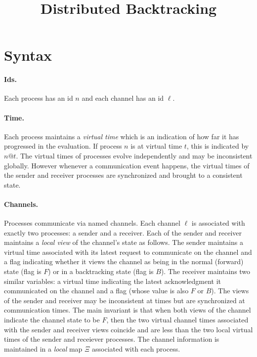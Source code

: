 \documentclass{article}
\title{Distributed Backtracking}
\author{}
\date{}
\begin{document}
\maketitle

\newcommand{\todo}[1]{\fbox{#1}}

\newcommand{\alt}{~|~}
\newcommand{\parc}[2]{#1 \,\|\, #2}
\newcommand{\send}[2]{\texttt{send}~#1~#2}
\newcommand{\stable}[1]{\texttt{stable}~#1}
\newcommand{\stableu}[1]{\underline{\texttt{stable}}~#1}
\newcommand{\backtrack}[1]{\texttt{backtrack}~#1}
\newcommand{\abacktrack}{\texttt{backtrack}\_}
\newcommand{\recv}[4]{\texttt{recv}~(#1.#2) \talloblong (#3.#4)}
\newcommand{\proc}[5]{\langle #1@#5:~ #3, #2,#4 \rangle}

\section{Syntax} 

\paragraph*{Ids.} Each process has an id $n$ and each channel has an id
$\ell$.

\paragraph*{Time.} Each process maintains a \emph{virtual time} which is an
indication of how far it has progressed in the evaluation. If process $n$ is
at virtual time $t$, this is indicated by $n@t$. The virtual times of
processes evolve independently and may be inconsistent globally. However
whenever a communication event happens, the virtual times of the sender and
receiver processes are synchronized and brought to a consistent state.

\paragraph*{Channels.} Processes communicate via named channels. Each channel
$\ell$ is associated with exactly two processes: a sender and a receiver.
Each of the sender and receiver maintains a \emph{local view} of the
channel's state as follows. The sender maintains a virtual time associated
with its latest request to communicate on the channel and a flag indicating
whether it views the channel as being in the normal (forward) state (flag is
$F$) or in a backtracking state (flag is $B$). The receiver maintains two
similar variables: a virtual time indicating the latest acknowledgment it
communicated on the channel and a flag (whose value is also $F$ or $B$).  The
views of the sender and receiver may be inconsistent at times but are
synchronized at communication times. The main invariant is that when both
views of the channel indicate the channel state to be $F$, then the two
virtual channel times associated with the sender and receiver views coincide
and are less than the two local virtual times of the sender and receiever
processes. The channel information is maintained in a \emph{local} map $\Xi$
associated with each process.
\end{document}
